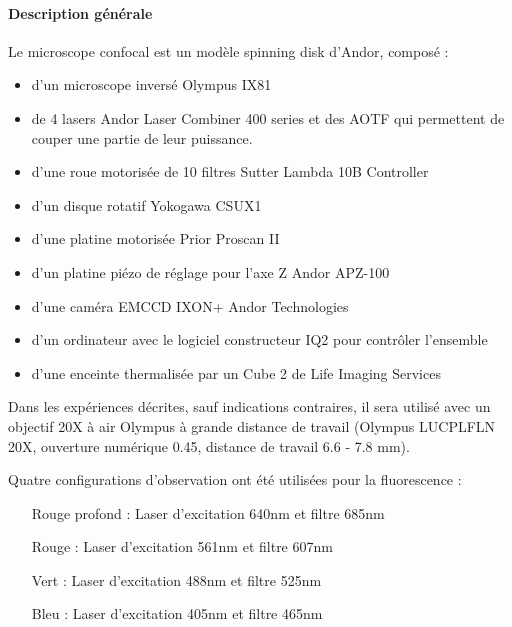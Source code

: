 %	
	
	\paragraph{Description générale}
	
	Le microscope confocal est un modèle \og spinning  disk \fg d'Andor, composé : 
	\begin{itemize}
	\item d'un microscope inversé Olympus IX81
	\item de 4 lasers Andor Laser Combiner 400 series et des AOTF qui permettent de couper une partie de leur puissance.
	\item d'une roue motorisée de 10 filtres Sutter Lambda 10B Controller
	\item d'un disque rotatif Yokogawa CSUX1
	\item d'une platine motorisée Prior Proscan II
	\item d'un platine piézo de réglage pour l'axe Z Andor APZ-100
	\item d'une caméra EMCCD IXON+ Andor Technologies
	\item d'un ordinateur avec le logiciel constructeur IQ2 pour contrôler l'ensemble
	\item d'une enceinte thermalisée par un Cube 2 de Life Imaging Services
\end{itemize}	 

Dans les expériences décrites, sauf indications contraires, il sera utilisé avec un objectif 20X à air Olympus à grande distance de travail (Olympus LUCPLFLN 20X, ouverture numérique 0.45, distance de travail 6.6 - 7.8 mm).

Quatre configurations d'observation ont été utilisées pour la fluorescence : 
\begin{itemize}
\item[Rouge profond] : Laser d'excitation 640nm et filtre 685nm
\item[Rouge] : Laser d'excitation 561nm et filtre 607nm
\item[Vert] : Laser d'excitation 488nm et filtre 525nm
\item[Bleu] : Laser d'excitation 405nm et filtre 465nm
\end{itemize}
	
